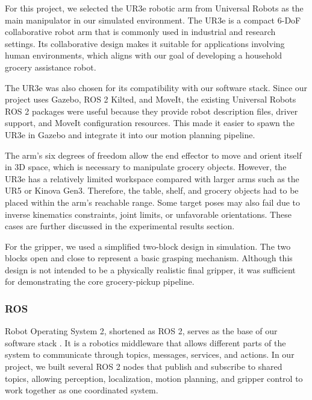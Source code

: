 \documentclass{article}
\begin{document}
For this project, we selected the UR3e robotic arm from Universal Robots as the main manipulator in our simulated environment. The UR3e is a compact 6-DoF collaborative robot arm that is commonly used in industrial and research settings. Its collaborative design makes it suitable for applications involving human environments, which aligns with our goal of developing a household grocery assistance robot.

The UR3e was also chosen for its compatibility with our software stack. Since our project uses Gazebo, ROS 2 Kilted, and MoveIt, the existing Universal Robots ROS 2 packages were useful because they provide robot description files, driver support, and MoveIt configuration resources. This made it easier to spawn the UR3e in Gazebo and integrate it into our motion planning pipeline.

The arm’s six degrees of freedom allow the end effector to move and orient itself in 3D space, which is necessary to manipulate grocery objects. However, the UR3e has a relatively limited workspace compared with larger arms such as the UR5 or Kinova Gen3. Therefore, the table, shelf, and grocery objects had to be placed within the arm’s reachable range. Some target poses may also fail due to inverse kinematics constraints, joint limits, or unfavorable orientations. These cases are further discussed in the experimental results section.

For the gripper, we used a simplified two-block design in simulation. The two blocks open and close to represent a basic grasping mechanism. Although this design is not intended to be a physically realistic final gripper, it was sufficient for demonstrating the core grocery-pickup pipeline.

\subsubsection{ROS}
Robot Operating System 2, shortened as ROS 2, serves as the base of our software stack \cite{quigley2009ros}. It is a robotics middleware that allows different parts of the system to communicate through topics, messages, services, and actions. In our project, we built several ROS 2 nodes that publish and subscribe to shared topics, allowing perception, localization, motion planning, and gripper control to work together as one coordinated system.
\end{document}
